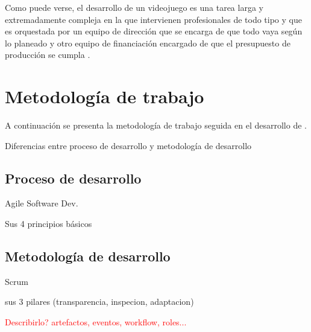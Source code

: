 Como puede verse, el desarrollo de un videojuego es una tarea larga y extremadamente compleja en la que intervienen profesionales de todo tipo y que es orquestada por un equipo de dirección que se encarga de que todo vaya según lo planeado y otro equipo de financiación encargado de que el presupuesto de producción se cumpla \cite{man-14}.

\section{Metodología de trabajo}

A continuación se presenta la metodología de trabajo seguida en el desarrollo de \MineRVa.

Diferencias entre proceso de desarrollo y metodología de desarrollo

\subsection{Proceso de desarrollo}

Agile Software Dev.

Sus 4 principios básicos 

\subsection{Metodología de desarrollo}

Scrum

sus 3 pilares (transparencia, inspecion, adaptacion)

\textcolor{red}{Describirlo? artefactos, eventos, workflow, roles...}